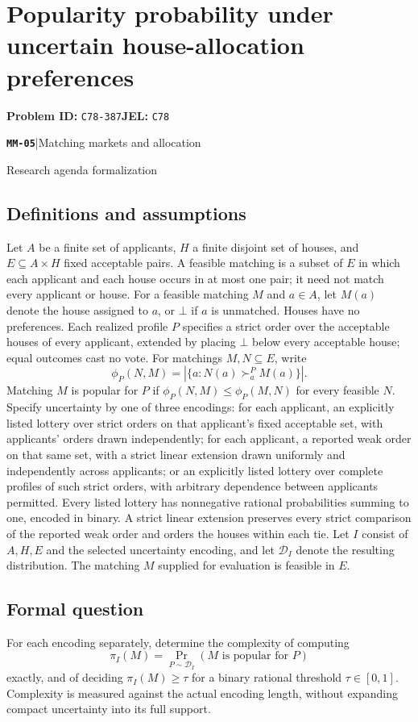 \documentclass[11pt,a4paper]{article}
\newcommand{\entrymeta}[3]{{\sffamily\small\color{muted}\textbf{\texttt{#1}}\quad|\quad #2\par #3\par}}
\begin{document}
\section*{Popularity probability under uncertain house-allocation preferences}
\textbf{Problem ID:} \texttt{C78-387}\quad \textbf{JEL:} \texttt{C78}\par
\label{problem:OP-0546}
\label{beyond:MM-05}
\entrymeta{MM-05}{Matching markets and allocation}{Research agenda formalization}
\subsection*{Definitions and assumptions}
Let $A$ be a finite set of applicants, $H$ a finite disjoint set of houses, and $E\subseteq A\times H$ fixed acceptable pairs. A feasible matching is a subset of $E$ in which each applicant and each house occurs in at most one pair; it need not match every applicant or house. For a feasible matching $M$ and $a\in A$, let $M(a)$ denote the house assigned to $a$, or $\bot$ if $a$ is unmatched. Houses have no preferences. Each realized profile $P$ specifies a strict order over the acceptable houses of every applicant, extended by placing $\bot$ below every acceptable house; equal outcomes cast no vote. For matchings $M,N\subseteq E$, write
\[
 \phi_P(N,M)=|\{a:N(a)\succ_a^P M(a)\}|.
\]
Matching $M$ is popular for $P$ if $\phi_P(N,M)\le\phi_P(M,N)$ for every feasible $N$. Specify uncertainty by one of three encodings: for each applicant, an explicitly listed lottery over strict orders on that applicant's fixed acceptable set, with applicants' orders drawn independently; for each applicant, a reported weak order on that same set, with a strict linear extension drawn uniformly and independently across applicants; or an explicitly listed lottery over complete profiles of such strict orders, with arbitrary dependence between applicants permitted. Every listed lottery has nonnegative rational probabilities summing to one, encoded in binary. A strict linear extension preserves every strict comparison of the reported weak order and orders the houses within each tie. Let $I$ consist of $A,H,E$ and the selected uncertainty encoding, and let $\mathcal D_I$ denote the resulting distribution. The matching $M$ supplied for evaluation is feasible in $E$.
\subsection*{Formal question}
For each encoding separately, determine the complexity of computing
\[
 \pi_I(M)=\Pr_{P\sim\mathcal D_I}(M\text{ is popular for }P)
\]
exactly, and of deciding $\pi_I(M)\ge\tau$ for a binary rational threshold $\tau\in[0,1]$. Complexity is measured against the actual encoding length, without expanding compact uncertainty into its full support.
\end{document}
